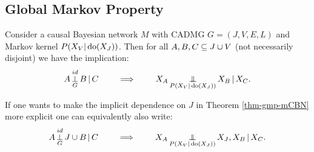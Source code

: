 \subsection{Global Markov Property}

\begin{Thm}
\label{thm-gmp-mCBN}
Consider a causal Bayesian network $M$  with \observational CADMG $G=(J,V,E,L)$ 
and \observational Markov kernel $P(X_V|\operatorname{do}(X_J))$.
Then for all $A, B, C \subseteq J \cup V$ (not necessarily disjoint) we have the implication:
\[ A \operatorname*{\perp}^{id}_G B \operatorname*{|} C \qquad \implies \qquad X_A \operatorname*{\perp\mkern-11mu\perp}_{P(X_V|\operatorname{do}(X_J))} X_B \operatorname*{|} X_C.   \]
\end{Thm}

\begin{Rem}
    If one wants to make the implicit dependence on $J$ in Theorem \ref{thm-gmp-mCBN} 
    more explicit one can equivalently also write:
\[ A \operatorname*{\perp}^{id}_G J \cup B \operatorname*{|} C \qquad \implies \qquad X_A \operatorname*{\perp\mkern-11mu\perp}_{P(X_V|\operatorname{do}(X_J))} X_J,X_{B} \operatorname*{|} X_C.   \]
\end{Rem}

